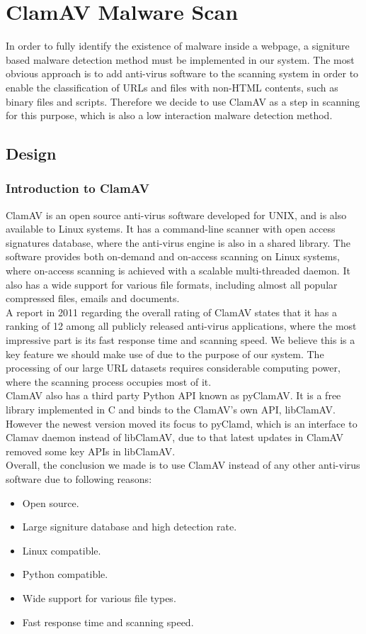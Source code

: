 
\section{ClamAV Malware Scan}
In order to fully identify the existence of malware inside a webpage, a 
signiture based malware detection method must be implemented in our system. 
The most obvious approach is to add anti-virus software to the scanning system 
in order to enable the classification of URLs and files with non-HTML contents, such 
as binary files and scripts. Therefore we decide to use ClamAV as a step in 
scanning for this purpose, which is also a low interaction malware detection 
method. 

\subsection{Design}
\subsubsection{Introduction to ClamAV}
ClamAV is an open source anti-virus software developed for UNIX, and is also 
available to Linux systems. It has a command-line scanner with open access 
signatures database, where the anti-virus engine is also in a shared library. 
The software provides both on-demand and on-access scanning on Linux systems, 
where on-access scanning is achieved with a scalable multi-threaded daemon. 
It also has a wide support for various file formats, including almost all 
popular compressed files, emails and documents. \\
A report in 2011 regarding the overall rating of ClamAV states that it has a 
ranking of 12 among all publicly released anti-virus 
applications,\cite{shandowserver} where the most impressive part is its fast 
response time and scanning speed. We believe this is a key feature we should 
make use of due to the purpose of our system. The processing of our large URL
datasets requires considerable computing power, where the scanning process 
occupies most of it. \\
ClamAV also has a third party Python API known as pyClamAV. It is a free 
library implemented in C and binds to the ClamAV's own API, libClamAV. However 
the newest version moved its focus to pyClamd, which is an interface to Clamav 
daemon instead of libClamAV, due to that latest updates in ClamAV removed some 
key APIs in libClamAV. \\
Overall, the conclusion we made is to use ClamAV instead of any other 
anti-virus software due to following reasons: 
\begin{itemize}
\item Open source.
\item Large signiture database and high detection rate.
\item Linux compatible. 
\item Python compatible. 
\item Wide support for various file types. 
\item Fast response time and scanning speed. 
\end{itemize}

